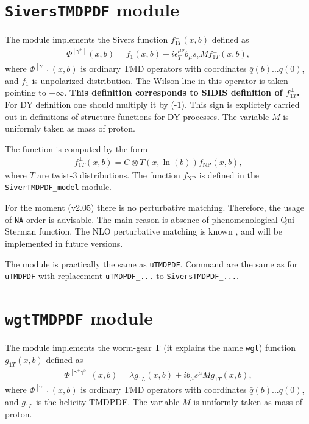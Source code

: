 \documentclass[prd,nofootinbib,eqsecnum,final]{revtex4}
\renewcommand{\(}{\left(}
\renewcommand{\)}{\right)}
\renewcommand{\[}{\left[}
\renewcommand{\]}{\right]}
\begin{document}
\section{\texttt{SiversTMDPDF} module}
\label{lpTMDPDF}

The module implements the Sivers function $f_{1T}^\perp(x,b)$ defined as
\begin{eqnarray}
\Phi^{[\gamma^+]}(x,b)=f_1(x,b)+i\epsilon^{\mu\nu}_T b_\mu s_\nu M f_{1T}^\perp(x,b),
\end{eqnarray}
where $\Phi^{[\gamma^+]}(x,b)$ is ordinary TMD operators with coordinates $\bar q(b)...q(0)$, and $f_1$ is unpolarized distribution. The Wilson line in this operator is taken pointing to $+\infty$. \textbf{This definition corresponds to SIDIS definition of $f_{1T}^\perp$.} For DY definition one should multiply it by (-1). This sign is explictely carried out in definitions of structure functions for DY processes. The variable $M$ is uniformly taken as mass of proton.

The function is computed by the form
\begin{eqnarray}
f_{1T}^\perp(x,b)=C\otimes T(x,\ln(b)) f_{\text{NP}}(x,b),
\end{eqnarray}
where $T$ are twist-3 distributions.  The function $f_{\text{NP}}$ is defined in the \texttt{SiverTMDPDF\_model} module.
\begin{tcolorbox}
For the moment (v2.05) there is no perturbative matching. Therefore, the usage of \texttt{NA}-order is advisable. The main reason is absence of phenomenological Qui-Sterman function. The NLO perturbative matching is known \cite{Scimemi:2019gge}, and will be implemented in future versions.
\end{tcolorbox}

The module is practically the same as \texttt{uTMDPDF}. Command are the same as for \texttt{uTMDPDF} with replacement \texttt{uTMDPDF\_...} to \texttt{SiversTMDPDF\_...}.


\section{\texttt{wgtTMDPDF} module}
\label{lpTMDPDF}

The module implements the worm-gear T (it explains the name \texttt{wgt}) function $g_{1T}(x,b)$ defined as
\begin{eqnarray}
\Phi^{[\gamma^+\gamma^5]}(x,b)=\lambda g_{1L}(x,b)+ib_\mu s^\mu M g_{1T}(x,b),
\end{eqnarray}
where $\Phi^{[\gamma^+]}(x,b)$ is ordinary TMD operators with coordinates $\bar q(b)...q(0)$, and $g_{1L}$ is the helicity TMDPDF. The variable $M$ is uniformly taken as mass of proton.
\end{document}

